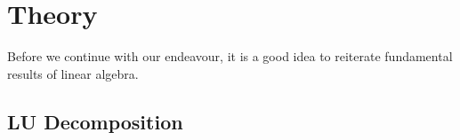 \section{Theory}

Before we continue with our endeavour, it is a good idea to reiterate fundamental results of linear algebra.

\subsection{LU Decomposition}